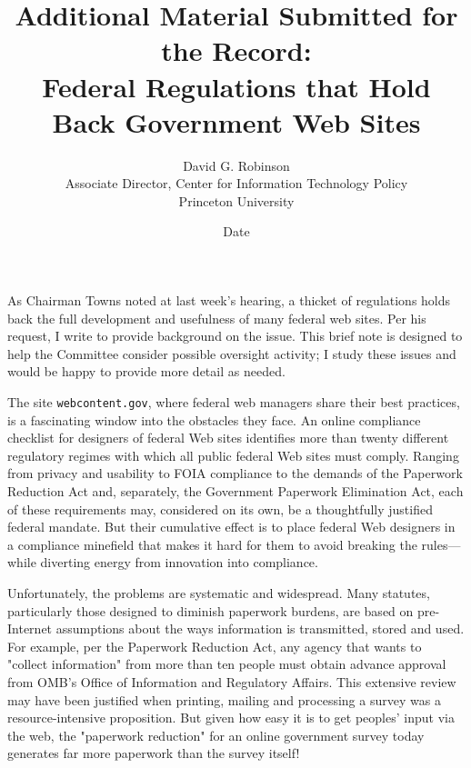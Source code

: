 \documentclass{article}
\title{Additional Material Submitted for the Record: \\
Federal Regulations that Hold Back Government Web Sites}
\author{David G. Robinson\\
Associate Director, Center for Information Technology Policy\\
Princeton University}
\date{Date}
\begin{document}
   \maketitle
 As Chairman Towns noted at last week's hearing, a thicket of regulations 
holds back the full development and usefulness of many federal web sites.  Per 
his request, I write to provide background on the issue. This brief note is 
designed to help the Committee consider possible oversight activity; I study 
these issues and would be happy to provide more detail as needed.

The site \texttt{webcontent.gov}, where federal web managers share their best 
practices, is a fascinating window into the obstacles they face. An online 
compliance checklist for designers of federal Web sites identifies more than 
twenty different regulatory regimes with which all public federal Web sites 
must comply.  Ranging from privacy and usability to FOIA compliance to the 
demands of the Paperwork Reduction Act and, separately, the Government 
Paperwork Elimination Act, each of these requirements may, considered on its 
own, be a thoughtfully justified federal mandate. But their cumulative effect 
is to place federal Web designers in a compliance minefield that makes it hard 
for them to avoid breaking the rules—while diverting energy from innovation 
into compliance.

 Unfortunately, the problems are systematic and widespread. Many statutes, 
particularly those designed to diminish paperwork burdens, are based on 
pre-Internet assumptions about the ways information is transmitted, stored and 
used. For example, per the Paperwork Reduction Act, any agency that wants to 
"collect information" from more than ten people must obtain advance approval 
from OMB's Office of Information and Regulatory Affairs. This extensive review 
may have been justified when printing, mailing and processing a survey was a 
resource-intensive proposition. But given how easy it is to get peoples' input 
via the web, the "paperwork reduction" for an online government survey today 
generates far more paperwork than the survey itself!




\end{document}
